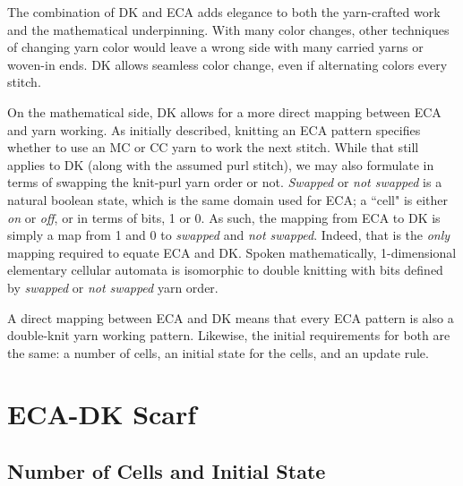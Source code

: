 \documentclass{../knittingpattern}
\begin{document}
The combination of DK and ECA adds elegance to both the yarn-crafted work and the mathematical underpinning. With many color changes, other techniques of changing yarn color would leave a wrong side with many carried yarns or woven-in ends. DK allows seamless color change, even if alternating colors every stitch.

On the mathematical side, DK allows for a more direct mapping between ECA and yarn working. As initially described, knitting an ECA pattern specifies whether to use an MC or CC yarn to work the next stitch. While that still applies to DK (along with the assumed purl stitch), we may also formulate in terms of swapping the knit-purl yarn order or not. \emph{Swapped} or \emph{not swapped} is a natural boolean state, which is the same domain used for ECA; a ``cell" is either \emph{on} or \emph{off}, or in terms of bits, 1 or 0. As such, the mapping from ECA to DK is simply a map from 1 and 0 to \emph{swapped} and \emph{not swapped}. Indeed, that is the \emph{only} mapping required to equate ECA and DK. Spoken mathematically, 1-dimensional elementary cellular automata is isomorphic to double knitting with bits defined by \emph{swapped} or \emph{not swapped} yarn order.

A direct mapping between ECA and DK means that every ECA pattern is also a double-knit yarn working pattern. Likewise, the initial requirements for both are the same: a number of cells, an initial state for the cells, and an update rule. 

\newpage
\section*{ECA-DK Scarf}



\subsection*{Number of Cells and Initial State}
\end{document}
